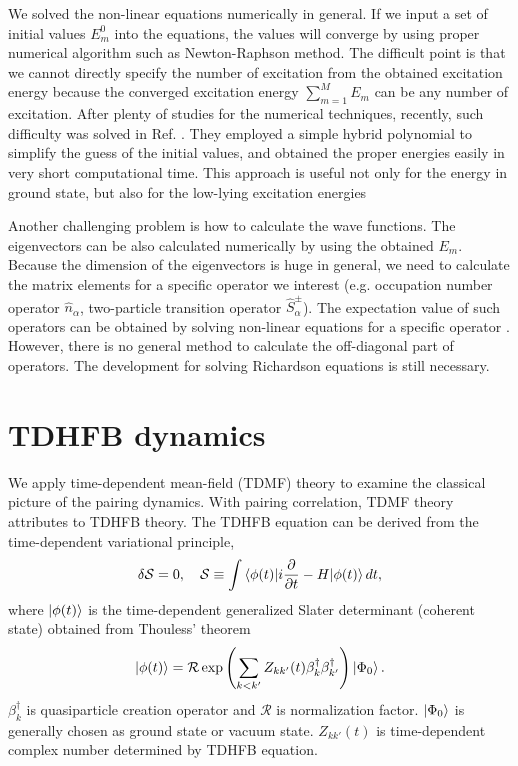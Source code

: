 \documentclass[11pt]{book} %
\begin{document}
We solved the non-linear equations numerically in general. If we input a set of initial values $E_{m}^{0}$ into the equations, the values will converge by using proper numerical algorithm such as Newton-Raphson method. The difficult point is that we cannot directly specify the number of excitation from the obtained excitation energy because the converged excitation energy $\sum_{m=1}^M E_{m}$ can be any number of excitation. After plenty of studies for the numerical techniques, recently, such difficulty was solved in Ref. \cite{QC15}. They employed a simple hybrid polynomial to simplify the guess of the initial values, and obtained the proper energies easily in very short computational time. This approach is useful not only for the energy in ground state, but also for the low-lying excitation energies

Another challenging problem is how to calculate the wave functions. The eigenvectors can be also calculated numerically by using the obtained $E_{m}$. Because the dimension of the eigenvectors is huge in general, we need to calculate the matrix elements for a specific operator we interest (e.g. occupation number operator $\hat{n}_{\alpha}$, two-particle transition operator $\hat{S}^{\pm}_{\alpha}$). The expectation value of such operators can be obtained by solving non-linear equations for a specific operator \cite{Richardson5}. However, there is no general method to calculate the off-diagonal part of operators. The development for solving Richardson equations is still necessary.

\section{TDHFB dynamics}
\label{2-2}
We apply time-dependent mean-field (TDMF) theory to examine the classical picture of the pairing dynamics. With pairing correlation, TDMF theory attributes to TDHFB theory.
The TDHFB equation can be derived from the time-dependent variational principle,
\begin{equation}
  \delta\mathcal{S}=0, \quad 
  \mathcal{S} \equiv \int \braket{\phi(t)|i\frac{\partial}{\partial t}-H|\phi(t)}dt ,
  \label{variation}
\end{equation}
where $\ket{\phi(t)}$ is the time-dependent generalized Slater determinant (coherent state) obtained from Thouless' theorem
\begin{equation}
  \ket{\phi(t)} = \mathcal{R}\exp{\left( \sum_{k<k'}Z_{kk'}(t)\beta_k^{\dag}\beta_{k'}^{\dag}
    \right)}\ket{\Phi_0} .
\end{equation}
$\beta_k^{\dag}$ is quasiparticle creation operator and $\mathcal{R}$ is normalization factor. $\ket{\Phi_0}$ is generally chosen as ground state or vacuum state. $Z_{kk'}(t)$ is time-dependent complex number determined by TDHFB equation.
\end{document}
